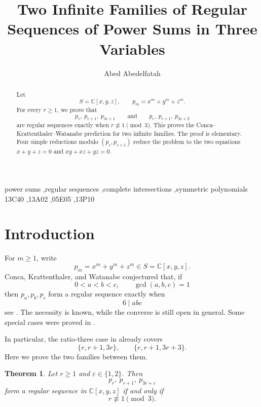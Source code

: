 \documentclass[preprint,12pt]{elsarticle}
\newtheorem{theorem}{Theorem}[section]
\newcommand{\C}{\mathbb C}
\begin{document}
\begin{frontmatter}

\title{Two Infinite Families of Regular Sequences of Power Sums in Three Variables}

\author[braude]{Abed Abedelfatah}
\address[braude]{Department of Mathematics, Braude College of Engineering, Karmiel, Israel}

\begin{abstract}
Let
$$
S=\C[x,y,z],\qquad p_m=x^m+y^m+z^m.
$$
For every $r\geq1$, we prove that
$$
p_r,\ p_{r+1},\ p_{3r+1}
\qquad\text{and}\qquad
p_r,\ p_{r+1},\ p_{3r+2}
$$
are regular sequences exactly when $r\not\equiv1\pmod3$. This proves the
Conca--Krattenthaler--Watanabe prediction for two infinite families. The proof
is elementary. Four simple reductions modulo $(p_r,p_{r+1})$ reduce the
problem to the two equations $x+y+z=0$ and $xy+xz+yz=0$.
\end{abstract}

\begin{keyword}
power sums \sep regular sequences \sep complete intersections \sep symmetric polynomials
\MSC[2020] 13C40 \sep 13A02 \sep 05E05 \sep 13P10
\end{keyword}

\end{frontmatter}

\section{Introduction}

For $m\geq1$, write
$$
p_m=x^m+y^m+z^m\in S=\C[x,y,z].
$$
Conca, Krattenthaler, and Watanabe conjectured that, if
$$
0<a<b<c,\qquad \gcd(a,b,c)=1
$$
then $p_a,p_b,p_c$ form a regular sequence exactly when
$$
6\mid abc
$$
see \cite{CKW}. The necessity is known, while the converse is still open in
general. Some special cases were proved in \cite{CKW,Chen,KumarMartino,CSS}.

In particular, the ratio-three case in \cite[Proposition~2.13]{CKW} already
covers
$$
\{r,r+1,3r\},\qquad \{r,r+1,3r+3\}.
$$
Here we prove the two families between them.

\begin{theorem}\label{thm:main}
Let $r\geq1$ and $\varepsilon\in\{1,2\}$. Then
$$
p_r,\ p_{r+1},\ p_{3r+\varepsilon}
$$
form a regular sequence in $\C[x,y,z]$ if and only if
$$
r\not\equiv1\pmod3.
$$
\end{theorem}
\end{document}
